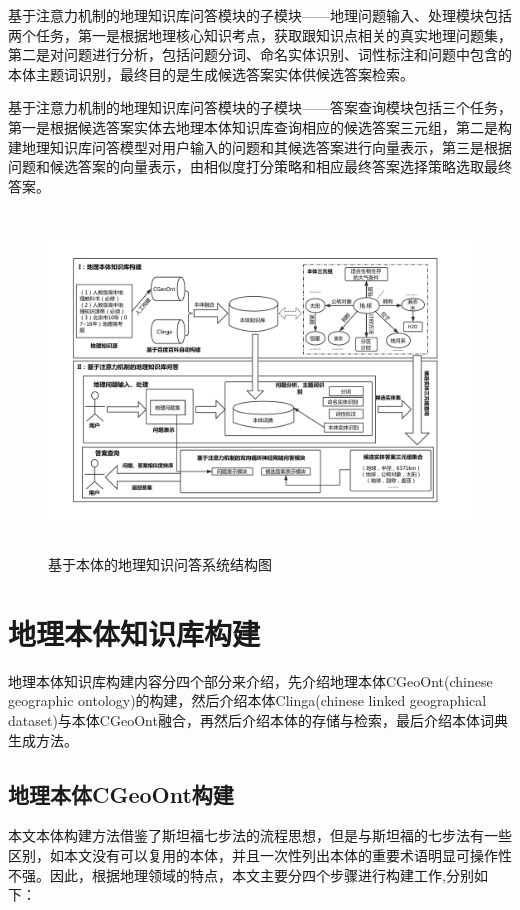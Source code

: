 基于注意力机制的地理知识库问答模块的子模块——地理问题输入、处理模块包括两个任务，第一是根据地理核心知识考点，获取跟知识点相关的真实地理问题集，第二是对问题进行分析，包括问题分词、命名实体识别、词性标注和问题中包含的本体主题词识别，最终目的是生成候选答案实体供候选答案检索。

基于注意力机制的地理知识库问答模块的子模块——答案查询模块包括三个任务，第一是根据候选答案实体去地理本体知识库查询相应的候选答案三元组，第二是构建地理知识库问答模型对用户输入的问题和其候选答案进行向量表示，第三是根据问题和候选答案的向量表示，由相似度打分策略和相应最终答案选择策略选取最终答案。

\begin{figure}[!htb]
	\centering\includegraphics[height=9cm]{resource/graduation}
	\caption{基于本体的地理知识问答系统结构图}
	\label{fig:graduation}
\end{figure}

\section{地理本体知识库构建}
地理本体知识库构建内容分四个部分来介绍，先介绍地理本体CGeoOnt(chinese geographic ontology)的构建，然后介绍本体Clinga(chinese linked geographical dataset)与本体CGeoOnt融合，再然后介绍本体的存储与检索，最后介绍本体词典生成方法。

\subsection{地理本体CGeoOnt构建}\label{section:CGeoOnt_build}
本文本体构建方法借鉴了斯坦福七步法的流程思想，但是与斯坦福的七步法有一些区别，如本文没有可以复用的本体，并且一次性列出本体的重要术语明显可操作性不强。因此，根据地理领域的特点，本文主要分四个步骤进行构建工作,分别如下：

